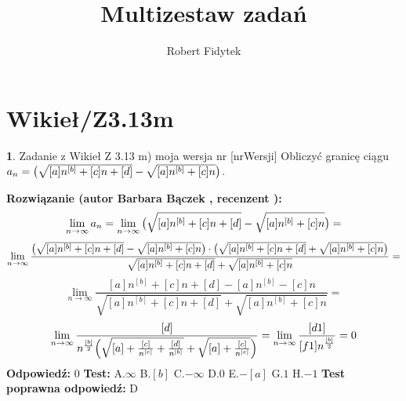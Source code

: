 \documentclass[12pt, a4paper]{article}
\title{Multizestaw zadań}
\author{Robert Fidytek}
\date{}
\theoremstyle{definition} %
\newtheorem{zad}{}
\newcommand{\kategoria}[1]{\section{#1}} %
\newcommand{\zadStart}[1]{\begin{zad}#1\newline} %
\newcommand{\zadStop}{\end{zad}}   %
\newcommand{\rozwStart}[2]{\noindent \textbf{Rozwiązanie (autor #1 , recenzent #2): }\newline} %
\newcommand{\rozwStop}{\newline}                                            %
\newcommand{\odpStart}{\noindent \textbf{Odpowiedź:}\newline}    %
\newcommand{\odpStop}{\newline}                                             %
\newcommand{\testStart}{\noindent \textbf{Test:}\newline} %
\newcommand{\testStop}{\newline} %
\newcommand{\kluczStart}{\noindent \textbf{Test poprawna odpowiedź:}\newline} %
\newcommand{\kluczStop}{\newline} %
\begin{document}
\maketitle


\kategoria{Wikieł/Z3.13m}
\zadStart{Zadanie z Wikieł Z 3.13 m) moja wersja nr [nrWersji]}
Obliczyć granicę ciągu $a_n= \big{(}\sqrt{[a]n^{[b]}+[c]n+[d]} - \sqrt{[a]n^{[b]}+[c]n}\big{)}$.
\zadStop
\rozwStart{Barbara Bączek}{}
$$\lim_{n \rightarrow \infty} a_n= \lim_{n \rightarrow \infty}  \big{(}\sqrt{[a]n^{[b]}+[c]n+[d]} - \sqrt{[a]n^{[b]}+[c]n}\big{)}= $$
$$\lim_{n \rightarrow \infty}  \frac{\big{(}\sqrt{[a]n^{[b]}+[c]n+[d]} - \sqrt{[a]n^{[b]}+[c]n}\big{)}\cdot \big{(} \sqrt{[a]n^{[b]}+[c]n+[d]} + \sqrt{[a]n^{[b]}+[c]n} \big{)}}{\sqrt{[a]n^{[b]}+[c]n+[d]} + \sqrt{[a]n^{[b]}+[c]n}}=$$
$$\lim_{n \rightarrow \infty}  \frac{[a]n^{[b]}+[c]n+[d]-[a]n^{[b]}-[c]n}{\sqrt{[a]n^{[b]}+[c]n+[d]} + \sqrt{[a]n^{[b]}+[c]n}}=$$
$$ \lim_{n \rightarrow \infty}  \frac{[d]}{n^{\frac{[b]}{2}}\Big{(}\sqrt{[a]+\frac{[c]}{n^{[e]}}+\frac{[d]}{n^{[b]}}} + \sqrt{[a]+\frac{[c]}{n^{[e]}}}\Big{)}}=\lim_{n \rightarrow \infty} \frac{[d1]}{[f1]n^{\frac{[b]}{2}}}=0$$
\rozwStop
\odpStart
$0$
\odpStop
\testStart
A.$\infty$
B.$[b]$
C.$-\infty$
D.$0$
E.$-[a]$
G.$1$
H.$-1$
\testStop
\kluczStart
D
\kluczStop
\end{document}
